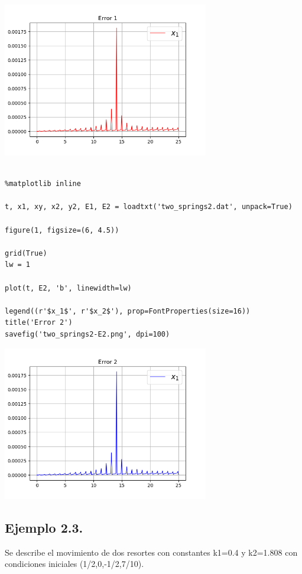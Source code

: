 \documentclass{article} %
\begin{document}
\begin{center}
 	\includegraphics[width=9cm]{two_springs2-E1.png}
 \end{center}




\begin{verbatim} 

%matplotlib inline

t, x1, xy, x2, y2, E1, E2 = loadtxt('two_springs2.dat', unpack=True)

figure(1, figsize=(6, 4.5))

grid(True)
lw = 1

plot(t, E2, 'b', linewidth=lw)

legend((r'$x_1$', r'$x_2$'), prop=FontProperties(size=16))
title('Error 2')
savefig('two_springs2-E2.png', dpi=100)

\end{verbatim}



\begin{center}
 	\includegraphics[width=9cm]{two_springs2-E2.png}
 \end{center}




\subsection{Ejemplo 2.3.}
Se describe el movimiento de dos resortes con constantes k1=0.4 y k2=1.808 con condiciones iniciales (1/2,0,-1/2,7/10).
\end{document}
